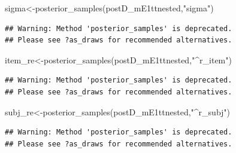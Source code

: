 \documentclass[
  12pt,
]{krantz}
\newenvironment{Shaded}{\begin{snugshade}}{\end{snugshade}}
\newcommand{\FunctionTok}[1]{\textcolor[rgb]{0.00,0.00,0.00}{#1}}
\newcommand{\NormalTok}[1]{#1}
\newcommand{\OtherTok}[1]{\textcolor[rgb]{0.56,0.35,0.01}{#1}}
\newcommand{\StringTok}[1]{\textcolor[rgb]{0.31,0.60,0.02}{#1}}
\theoremstyle{definition}
\theoremstyle{definition}
\theoremstyle{definition}
\theoremstyle{definition}
\theoremstyle{remark}
\begin{document}
\begin{Shaded}
\begin{Highlighting}[]
\NormalTok{sigma}\OtherTok{\textless{}{-}}\FunctionTok{posterior\_samples}\NormalTok{(postD\_mE1ttnested,}\StringTok{"sigma"}\NormalTok{)}
\end{Highlighting}
\end{Shaded}

\begin{verbatim}
## Warning: Method 'posterior_samples' is deprecated.
## Please see ?as_draws for recommended alternatives.
\end{verbatim}

\begin{Shaded}
\begin{Highlighting}[]
\NormalTok{item\_re}\OtherTok{\textless{}{-}}\FunctionTok{posterior\_samples}\NormalTok{(postD\_mE1ttnested,}\StringTok{"\^{}r\_item"}\NormalTok{)}
\end{Highlighting}
\end{Shaded}

\begin{verbatim}
## Warning: Method 'posterior_samples' is deprecated.
## Please see ?as_draws for recommended alternatives.
\end{verbatim}

\begin{Shaded}
\begin{Highlighting}[]
\NormalTok{subj\_re}\OtherTok{\textless{}{-}}\FunctionTok{posterior\_samples}\NormalTok{(postD\_mE1ttnested,}\StringTok{"\^{}r\_subj"}\NormalTok{)}
\end{Highlighting}
\end{Shaded}

\begin{verbatim}
## Warning: Method 'posterior_samples' is deprecated.
## Please see ?as_draws for recommended alternatives.
\end{verbatim}
\end{document}
